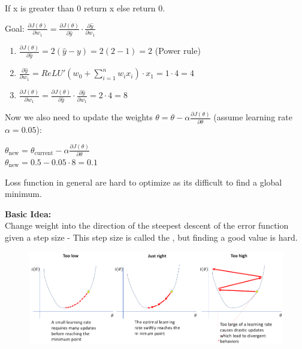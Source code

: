 \documentclass[
../../EiKI_Summary.tex,
]
{subfiles}
\begin{document}
\begin{defbox}
    If x is greater than 0 return x else return 0.
\end{defbox}

Goal: $\displaystyle \frac{\partial J(\theta)}{\partial w_1} = \frac{\partial J(\theta)}{\partial \hat{y}} \cdot \frac{\partial \hat{y}}{\partial w_1}$

\begin{mathbox*}
    \begin{enumerate}
        \item $\displaystyle \frac{\partial J(\theta)}{\partial \hat{y}} = 2(\hat{y} - y) = 2(2 - 1) = 2$ (Power rule)
        \item $\frac{\partial \hat{y}}{\partial w_1} = ReLU'\left(w_0 + \sum_{i=1}^{n} w_ix_i\right) \cdot x_1 = 1 \cdot 4 = 4$
        \item $\displaystyle \frac{\partial J(\theta)}{\partial w_1} = \frac{\partial J(\theta)}{\partial \hat{y}} \cdot \frac{\partial \hat{y}}{\partial w_1} = 2 \cdot 4 = 8$
    \end{enumerate}

    Now we also need to update the weights $\theta = \theta - \alpha \frac{\partial J(\theta)}{\partial \theta}$ (assume learning rate $\alpha = 0.05$):

    $\theta_{\text{new}} = \theta_{\text{current}} - \alpha \frac{\partial J(\theta)}{\partial \theta}$\\
    $\theta_{\text{new}} = 0.5 - 0.05 \cdot 8 = 0.1$
\end{mathbox*}

Loss function in general are hard to optimize as its difficult to find a global minimum.

\textbf{Basic Idea:}\\
Change weight into the direction of the steepest descent of the error function given a step size - This step size is called the , but finding a good value is hard.

\begin{figure}
    [H]
    \centering
    \includegraphics[width=\textwidth]{Pics/11/LearningRate.png}
\end{figure}
\end{document}
